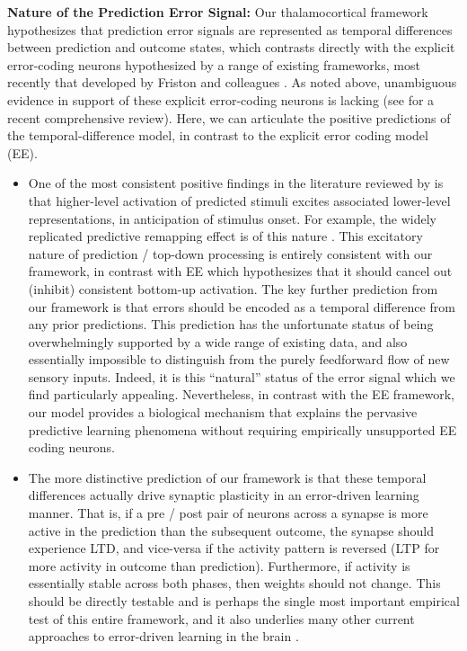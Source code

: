 \documentclass[11pt,twoside]{article}
\newif\myifpdf
\begin{document}
{\bf Nature of the Prediction Error Signal:} Our thalamocortical framework hypothesizes that prediction error signals are represented as temporal differences between prediction and outcome states, which contrasts directly with the explicit error-coding neurons hypothesized by a range of existing frameworks, most recently that developed by Friston and colleagues \cite{Friston10}.  As noted above, unambiguous evidence in support of these explicit error-coding neurons is lacking (see  for a recent comprehensive review).  Here, we can articulate the positive predictions of the temporal-difference model, in contrast to the explicit error coding model (EE).
\begin{itemize}
	\item One of the most consistent positive findings in the literature reviewed by  is that higher-level activation of predicted stimuli excites associated lower-level representations, in anticipation of stimulus onset.  For example, the widely replicated predictive remapping effect is of this nature \cite{DuhamelColbyGoldberg92,CavanaghHuntAfrazEtAl10}.  This excitatory nature of prediction / top-down processing is entirely consistent with our framework, in contrast with EE which hypothesizes that it should cancel out (inhibit) consistent bottom-up activation.  The key further prediction from our framework is that errors should be encoded as a temporal difference from any prior predictions.  This prediction has the unfortunate status of being overwhelmingly supported by a wide range of existing data, and also essentially impossible to distinguish from the purely feedforward flow of new sensory inputs.  Indeed, it is this ``natural'' status of the error signal which we find particularly appealing.  Nevertheless, in contrast with the EE framework, our model provides a biological mechanism that explains the pervasive predictive learning phenomena without requiring empirically unsupported EE coding neurons.
	\item The more distinctive prediction of our framework is that these temporal differences actually drive synaptic plasticity in an error-driven learning manner.  That is, if a pre / post pair of neurons across a synapse is more active in the prediction than the subsequent outcome, the synapse should experience LTD, and vice-versa if the activity pattern is reversed (LTP for more activity in outcome than prediction).  Furthermore, if activity is essentially stable across both phases, then weights should not change.  This should be directly testable and is perhaps the single most important empirical test of this entire framework, and it also underlies many other current approaches to error-driven learning in the brain \cite{BengioMesnardFischerEtAl17,WhittingtonBogacz19,LillicrapSantoroMarrisEtAl20}.
\end{itemize}
\end{document}

